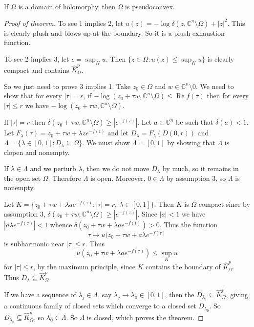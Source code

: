 \documentclass[12pt]{report}
\newcommand{\CC}{\mathbb{C}}
\renewcommand{\Re}{\operatorname{Re}}
\theoremstyle{definition}
\begin{document}
    If $\Omega$ is a domain of holomorphy, then $\Omega$ is pseudoconvex.
\begin{proof}[Proof of theorem]
    To see 1 implies 2, let $u(z) = -\log \delta(z, \CC^n \setminus \Omega) + |z|^2$. This is clearly plush and blows up at the boundary. So it is a plush exhaustion function.

    To see 2 implies 3, let $c = \sup_K u$. Then $\{z \in \Omega: u(z) \leq \sup_K u\}$ is clearly compact and contains $\hat K^p_\Omega$.

    So we just need to prove 3 implies 1. Take $z_0 \in \Omega$ and $w \in \CC^n \setminus 0$. We need to show that for every $|\tau| = r$, if $-\log(z_0 + \tau w, \CC^n \setminus \Omega) \leq \Re f(\tau)$ then for every $|\tau| \leq r$ we have $-\log(z_0 + \tau w, \CC^n \setminus \Omega)$.

    If $|\tau| = r$ then $\delta(z_0 + \tau w, \CC^n \setminus \Omega) \geq |e^{-f(\tau)}|$. Let $a \in \CC^n$ be such that $\delta(a) < 1$. Let $F_\lambda(\tau) = z_0 + \tau w + \lambda z e^{-f(t)}$ and let $D_\lambda = F_\lambda(D(0, r))$ and $\Lambda = \{\lambda \in [0, 1]: D_\lambda \subseteq \Omega\}$. We must show $\Lambda = [0, 1]$ by showing that $\Lambda$ is clopen and nonempty.

    If $\lambda \in \Lambda$ and we perturb $\lambda$, then we do not move $D_\lambda$ by much, so it remains in the open set $\Omega$. Therefore $\Lambda$ is open. Moreover, $0 \in \Lambda$ by assumption 3, so $\Lambda$ is nonempty.

    Let $K = \{z_0 + \tau w + \lambda a e^{-f(\tau)}: |\tau| = r, ~\lambda \in [0, 1]\}$. Then $K$ is $\Omega$-compact since by assumption 3, $\delta(z_0 + \tau w, \CC^n \setminus \Omega) \geq |e^{-f(\tau)}|$. Since $|a| < 1$ we have $|a\lambda e^{-f(\tau)}| < 1$ whence $\delta(z_0 + \tau w + \lambda ae^{-f(t)}) > 0$. Thus the function
    $$\tau \mapsto u(z_0 + \tau w + a \lambda e^{-f(\tau)}$$
    is subharmonic near $|\tau| \leq r$. Thus
    $$u(z_0 + \tau w + \lambda ae^{-f(\tau)}) \leq \sup_K u$$
    for $|\tau| \leq r$, by the maximum principle, since $K$ contains the boundary of $\hat K^p_\Omega$. Thus $D_\lambda \subseteq \hat K^p_\Omega$.

    If we have a sequence of $\lambda_j \in \Lambda$, say $\lambda_j \to \lambda_0 \in [0, 1]$, then the $D_{\lambda_j} \subseteq \hat K^p_\Omega$, giving a continuous family of closed sets which converge to a closed set $D_{\lambda_0}$. So $D_{\lambda_0} \subseteq \hat K^p_\Omega$, so $\lambda_0 \in \Lambda$. So $\Lambda$ is closed, which proves the theorem.
\end{proof}
\end{document}
